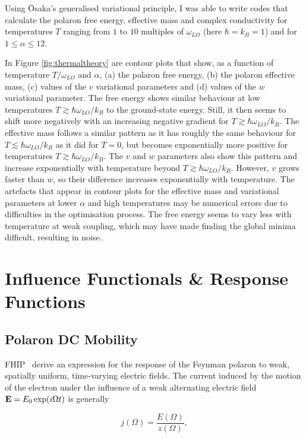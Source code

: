 Using \=Osaka's generalised variational principle, I was able to write codes that calculate the polaron free energy, effective mass and complex conductivity for temperatures $T$ ranging from $1$ to $10$ multiples of $\omega_{LO}$ (here $\hbar = k_B = 1$) and for $1\leq\alpha\leq12$. 

In Figure \ref{fig:thermaltheory} are contour plots that show, as a function of temperature $T / \omega_{LO}$ and $\alpha$, (a) the polaron free energy, (b) the polaron effective mass, (c) values of the $v$ variational parameters and (d) values of the $w$ variational parameter. The free energy shows similar behaviour at low temperatures $T \gtrsim \hbar \omega_{LO} / k_B$ to the ground-state energy. Still, it then seems to shift more negatively with an increasing negative gradient for $T \gtrsim \hbar \omega_{LO} / k_B$. The effective mass follows a similar pattern as it has roughly the same behaviour for $T \lesssim \hbar \omega_{LO} / k_B$ as it did for $T = 0$, but becomes exponentially more positive for temperatures $T \gtrsim \hbar \omega_{LO} / k_B$. The $v$ and $w$ parameters also show this pattern and increase exponentially with temperature beyond $T \gtrsim \hbar \omega_{LO} / k_B$. However, $v$ grows faster than $w$, so their difference increases exponentially with temperature. The artefacts that appear in contour plots for the effective mass and variational parameters at lower $\alpha$ and high temperatures may be numerical errors due to difficulties in the optimisation process. The free energy seems to vary less with temperature at weak coupling, which may have made finding the global minima difficult, resulting in noise. 

\section{Influence Functionals \& Response Functions}
\label{sec:2-3}

\subsection{Polaron DC Mobility}
\label{subsec:2-3-1}

FHIP~\cite{feynman_mobility_1962} derive an expression for the response of the Feynman polaron to weak, spatially uniform, time-varying electric fields. The current induced by the motion of the electron under the influence of a weak  alternating electric field $\vb{E} = E_0 \exp(i \Omega t)$ is generally

\begin{equation}
    j(\Omega) = \frac{E(\Omega)}{z(\Omega)} ,
\end{equation}

